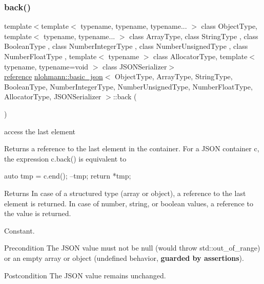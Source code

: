 \subsubsection{\texorpdfstring{back()}{back()}\hspace{0.1cm}{\footnotesize\ttfamily [1/2]}}
{\footnotesize\ttfamily template$<$template$<$ typename, typename, typename... $>$ class Object\+Type, template$<$ typename, typename... $>$ class Array\+Type, class String\+Type , class Boolean\+Type , class Number\+Integer\+Type , class Number\+Unsigned\+Type , class Number\+Float\+Type , template$<$ typename $>$ class Allocator\+Type, template$<$ typename, typename=void $>$ class J\+S\+O\+N\+Serializer$>$ \\
\hyperlink{classnlohmann_1_1basic__json_ac6a5eddd156c776ac75ff54cfe54a5bc}{reference} \hyperlink{classnlohmann_1_1basic__json}{nlohmann\+::basic\+\_\+json}$<$ Object\+Type, Array\+Type, String\+Type, Boolean\+Type, Number\+Integer\+Type, Number\+Unsigned\+Type, Number\+Float\+Type, Allocator\+Type, J\+S\+O\+N\+Serializer $>$\+::back (\begin{DoxyParamCaption}{ }\end{DoxyParamCaption})\hspace{0.3cm}{\ttfamily [inline]}}



access the last element 

Returns a reference to the last element in the container. For a J\+S\+ON container {\ttfamily c}, the expression {\ttfamily c.\+back()} is equivalent to 
\begin{DoxyCode}
\textcolor{keyword}{auto} tmp = c.end();
--tmp;
\textcolor{keywordflow}{return} *tmp;
\end{DoxyCode}


\begin{DoxyReturn}{Returns}
In case of a structured type (array or object), a reference to the last element is returned. In case of number, string, or boolean values, a reference to the value is returned.
\end{DoxyReturn}
Constant.

\begin{DoxyPrecond}{Precondition}
The J\+S\+ON value must not be {\ttfamily null} (would throw {\ttfamily std\+::out\+\_\+of\+\_\+range}) or an empty array or object (undefined behavior, {\bfseries guarded by assertions}). 
\end{DoxyPrecond}
\begin{DoxyPostcond}{Postcondition}
The J\+S\+ON value remains unchanged.
\end{DoxyPostcond}

